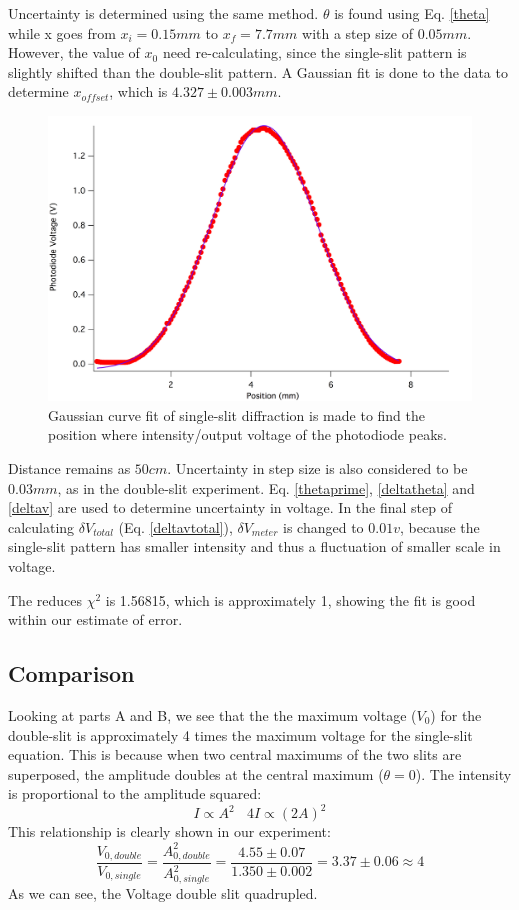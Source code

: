 \documentclass[prb,preprint]{revtex4-1}
\begin{document}
Uncertainty is determined using the same method. $\theta$ is found using Eq. \ref{theta} while x goes from $x_i = 0.15mm$ to $x_f = 7.7mm$ with a step size of $0.05mm$. However, the value of $x_0$ need re-calculating, since the single-slit pattern is slightly shifted than the double-slit pattern. A Gaussian fit is done to the data to determine $x_{offset}$, which is $4.327 \pm 0.003mm$.\\

\begin{figure}[h]
\centering
\includegraphics[width=7in]{singlegaus.png}
\caption{Gaussian curve fit of single-slit diffraction is made to find the position where intensity/output voltage of the photodiode peaks.}
\label{gasfit2}
\end{figure}

Distance remains as $50 cm$. Uncertainty in step size is also considered to be $0.03mm$, as in the double-slit experiment. Eq. \ref{thetaprime}, \ref{deltatheta} and \ref{deltav} are used to determine uncertainty in voltage. In the final step of calculating $\delta V_{total}$ (Eq. \ref{deltavtotal}), $\delta V_{meter}$ is changed to $0.01v$, because the single-slit pattern has smaller intensity and thus a fluctuation of smaller scale in voltage.

The reduces $\chi^2$ is 1.56815, which is approximately 1, showing the fit is good within our estimate of error.

\subsection{Comparison}

Looking at parts A and B, we see that the the maximum voltage ($V_0$) for the double-slit is approximately 4 times the maximum voltage for the single-slit equation. This is because when two central maximums of the two slits are superposed, the amplitude doubles at the central maximum ($\theta = 0$). The intensity is proportional to the amplitude squared: $$I \propto A^2 \ \ \ \	4I \propto(2A)^2$$ This relationship is clearly shown in our experiment: $$\frac{V_{0,double}}{V_{0,single}}=\frac{A_{0,double}^2}{A_{0,single}^2} = \frac{4.55\pm 0.07}{1.350 \pm 0.002}=3.37 \pm 0.06 \approx4$$ As we can see, the Voltage  double slit quadrupled.
\end{document}
